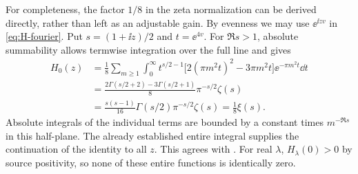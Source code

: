 For completeness, the factor $1/8$ in the zeta normalization can be
derived directly, rather than left as an adjustable gain. By evenness we
may use $\ee^{\ii zv}$ in \eqref{eq:H-fourier}. Put
$s=(1+\ii z)/2$ and $t=\ee^{4v}$. For $\Re s>1$, absolute summability
allows termwise integration over the full line and gives
\begin{align}
 H_0(z)
 &=\frac18\sum_{m\ge1}\int_0^\infty
 t^{s/2-1}\bigl[2(\pi m^2t)^2-3\pi m^2t\bigr]
                         \ee^{-\pi m^2t}\dd t
 \nonumber\\
 &=\frac{2\Gamma(s/2+2)-3\Gamma(s/2+1)}8
                         \pi^{-s/2}\zeta(s)
 \nonumber\\
 &=\frac{s(s-1)}{16}\Gamma(s/2)\pi^{-s/2}\zeta(s)
  =\frac18\xi(s).
 \label{eq:xi-normalization}
\end{align}
Absolute integrals of the individual terms are bounded by a constant
times $m^{-\Re s}$ in this half-plane. The already established entire
integral supplies the continuation of the identity to all $z$.
This agrees with \cite[Introduction, eqs.~(1)--(4)]{RodgersTao2020}.
For real $\lambda$, $H_\lambda(0)>0$ by source positivity, so none of
these entire functions is identically zero.
